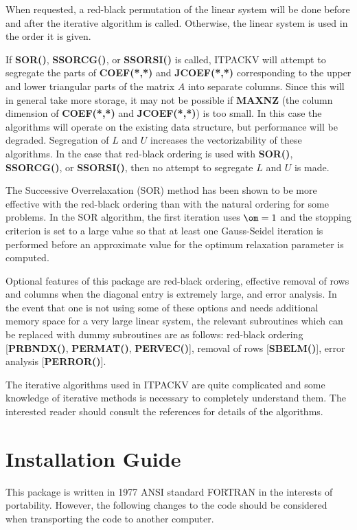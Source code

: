 When requested, a red-black permutation of the linear system will be
done before and after the iterative algorithm is called.  Otherwise,
the linear system is used in the order it is given.
 
If {\bf SOR()}, {\bf SSORCG()}, or {\bf SSORSI()} is called, ITPACKV 
will attempt to segregate the parts of {\bf COEF(*,*)} and 
{\bf JCOEF(*,*)} corresponding to the upper and lower triangular parts 
of the matrix $A$ into separate columns.  Since this will in general 
take more storage, it may not be possible if {\bf MAXNZ} (the column 
dimension of {\bf COEF(*,*)} and {\bf JCOEF(*,*)}) is too small.  In 
this case the algorithms will operate on the existing data structure, 
but performance will be degraded.  Segregation of $L$ and $U$ increases 
the vectorizability of these algorithms.  In the case that red-black
ordering is used with {\bf SOR()}, {\bf SSORCG()}, or {\bf SSORSI()}, 
then no attempt to segregate $L$ and $U$ is made.
 
The Successive Overrelaxation (SOR) method has been shown to be more
effective with the red-black ordering than with the natural ordering
for some problems.  In the SOR algorithm, the first iteration uses
$\om=1$ and the stopping criterion is set to a large value so that
at least one Gauss-Seidel iteration is performed before an approximate
value for the optimum relaxation parameter is computed.

Optional features of this package are red-black ordering, effective
removal of rows and columns when the diagonal entry is extremely large,
and error analysis.  In the event that one is not using some of these
options and needs additional memory space for a very large linear
system, the relevant subroutines which can be replaced with dummy
subroutines are as follows:  red-black ordering [{\bf PRBNDX()},
{\bf PERMAT()}, {\bf PERVEC()}], removal of rows [{\bf SBELM()}], 
error analysis [{\bf PERROR()}].
 
The iterative algorithms used in ITPACKV are quite complicated and
some knowledge of iterative methods is necessary to completely
understand them.  The interested reader should consult the references
for details of the algorithms.
 
\section{Installation Guide}
\label{install}

This package is written in 1977 ANSI standard FORTRAN in the interests
of portability.  However, the following changes to the code should be
considered when transporting the code to another computer.

